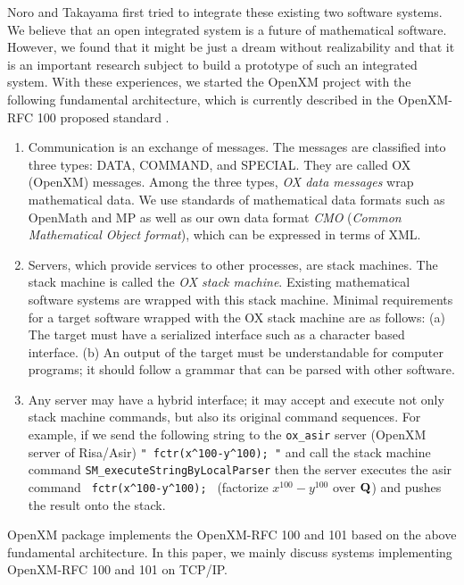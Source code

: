 Noro and Takayama first tried to integrate these existing two
software systems.
We believe that an open integrated system is a future of mathematical
software.
However, we found that it might be just a dream without realizability
and that it is an important research subject to
build a prototype of such an integrated system. %
With these experiences, we started the OpenXM project with the following
fundamental architecture, which is currently described in
the OpenXM-RFC 100  proposed standard %
\cite{ox-rfc-100}.
\begin{enumerate}
\item Communication is an exchange of messages. The messages are classified into
three types:
DATA, COMMAND, and SPECIAL.
They are called OX (OpenXM) messages.
Among the three types,
{\it OX data messages} wrap mathematical data.
We use standards of mathematical data formats such as OpenMath and MP
as well as our own data format {\it CMO}
({\it Common Mathematical Object format}),
which can be expressed in terms of XML.
\item Servers, which provide services to other processes, are stack machines.
The stack machine is called the
{\it OX stack machine}.
Existing mathematical software systems are wrapped with this stack machine.
Minimal requirements for a target software wrapped with the OX stack machine
are as follows:
(a) The target must have a serialized interface such as a character based
interface.
(b) An output of the target must be understandable for computer programs;
it should follow a grammar that can be parsed with other software.
\item Any server may have a hybrid interface;
it may accept and execute not only stack machine commands, 
but also its original command sequences.
For example,
if we send the following string to the {\tt ox\_asir} server 
(OpenXM server of Risa/Asir) 
\verb+" fctr(x^100-y^100); "+ 
and call the stack machine command 
\verb+SM_executeStringByLocalParser+
then the server executes the asir command 
\verb+ fctr(x^100-y^100); + 
(factorize $x^{100}-y^{100}$ over ${\bf Q}$)
and pushes the result onto the stack.
\end{enumerate}
OpenXM package  implements the OpenXM-RFC 100 \cite{ox-rfc-100}
and 101 \cite{ox-rfc-101} based on
the above fundamental architecture.
In this paper, we mainly discuss systems implementing
OpenXM-RFC 100 and 101 on TCP/IP.

